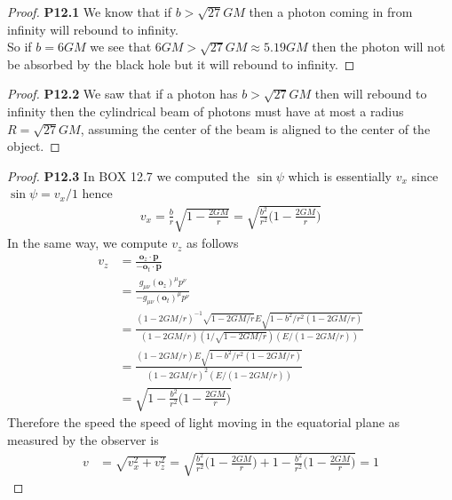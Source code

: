\documentclass[11pt]{article}
\theoremstyle{definition}
\begin{document}
\cleardoublepage
\begin{proof}{\textbf{P12.1}}
    We know that if $b > \sqrt{27}GM$ then a photon coming in from infinity
    will rebound to infinity.\\
    So if $b = 6GM$ we see that $6GM > \sqrt{27}GM \approx 5.19 GM$
    then the photon will not be absorbed by the black hole but it will rebound
    to infinity.
\end{proof}
\begin{proof}{\textbf{P12.2}}
    We saw that if a photon has $b > \sqrt{27}GM$ then will rebound to infinity
    then the cylindrical beam of photons must have at most a radius
    $R = \sqrt{27}GM$, assuming the center of the beam is aligned
    to the center of the object.
\end{proof}
\begin{proof}{\textbf{P12.3}}
    In BOX 12.7 we computed the $\sin\psi$ which is essentially $v_x$ since
    $\sin\psi = v_{x}/1$ hence
    \begin{align*}
        v_x = \frac{b}{r}\sqrt{1 - \frac{2GM}{r}}
        = \sqrt{\frac{b^2}{r^2}\bigg(1 - \frac{2GM}{r}\bigg)}
    \end{align*}
    In the same way, we compute $v_z$ as follows
    \begin{align*}
        v_z &= \frac{\bm{o}_z \cdot \bm{p}}{-\bm{o}_t\cdot\bm{p}}\\
        &= \frac{g_{\mu\nu}(\bm{o}_z)^\mu p^\nu}{-g_{\mu\nu}(\bm{o}_t)^\mu p^\nu}\\
        &= \frac{(1 - 2GM/r)^{-1}\sqrt{1 - 2GM/r}E\sqrt{1 - b^2/r^2(1- 2GM/r)}}
        {(1 - 2GM/r)(1/\sqrt{1 - 2GM/r})(E/(1 - 2GM/r))}\\
        &= \frac{(1 - 2GM/r)E\sqrt{1 - b^2/r^2(1- 2GM/r)}}
        {(1 - 2GM/r)^2(E/(1 - 2GM/r))}\\
        &= \sqrt{1 - \frac{b^2}{r^2}\bigg(1- \frac{2GM}{r}\bigg)}
    \end{align*}
    Therefore the speed the speed of light moving in the equatorial plane as
    measured by the observer is
    \begin{align*}
        v &= \sqrt{v_x^2 + v_z^2}
        = \sqrt{\frac{b^2}{r^2}\bigg(1 - \frac{2GM}{r}\bigg) + 1 - \frac{b^2}{r^2}\bigg(1- \frac{2GM}{r}\bigg)}
        = 1
    \end{align*}
\end{proof}
\cleardoublepage
\end{document}
